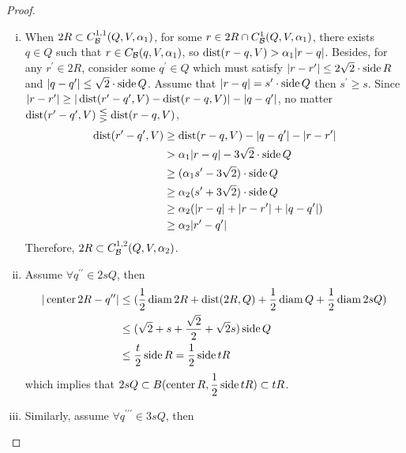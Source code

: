 \begin{proof}
    \begin{enumerate}[(i)]
        \item When $2R\subset C_\mathcal B^{1,1}(Q, V, \alpha_1)$, for some $r\in 2R\cap C_\mathcal B^1(Q, V, \alpha_1)$, there exists $q\in Q$ such that $r\in C_\mathcal B(q, V, \alpha_1)$, so $\operatorname{dist}(r-q, V)>\alpha_1|r-q|$. Besides, for any $r^\prime\in 2R$, consider some $q^\prime\in Q$ which must satisfy $|r-r^\prime|\leq 2\sqrt{2}\cdot\operatorname{side} R$ and $|q-q^\prime|\leq \sqrt{2}\cdot\operatorname{side} Q$. Assume that $|r-q| = s^\prime\cdot\operatorname{side} Q$ then $s^\prime \geq s$. Since $ |r-r^\prime| \geq|\operatorname{dist} (r^\prime-q^\prime, V)-\operatorname{dist}(r-q, V)| - |q-q^\prime|$, no matter $\operatorname{dist} (r^\prime-q^\prime, V)\lesseqgtr\operatorname{dist}(r-q, V)$,
        \begin{equation*}
            \begin{split}
                \operatorname{dist}(r^\prime-q^\prime, V) &\geq \operatorname{dist}(r-q, V)-|q-q^\prime|-|r-r^\prime| \\
                &> \alpha_1|r-q| - 3\sqrt{2} \cdot\operatorname{side} Q\\
                &\geq (\alpha_1 s^\prime- 3\sqrt{2})\cdot\operatorname{side} Q\\
                &\geq \alpha_2(s^\prime+3\sqrt{2})\cdot\operatorname{side} Q \\
                &\geq \alpha_2(|r-q|+|r-r^\prime|+|q-q^\prime|)\\
                &\geq \alpha_2|r^\prime-q^\prime|
            \end{split}
        \end{equation*}
        Therefore, $2R\subset  C_\mathcal B^{1,2}(Q, V, \alpha_2)$.
        \item Assume $\forall q^{\prime\prime}\in 2sQ$, then
        \begin{equation*}
            \begin{split}
                |\operatorname{center} 2R - q^{\prime\prime}| &\leq (\frac{1}{2}\operatorname{diam} 2R + \operatorname{dist}(2R, Q) + \frac{1}{2}\operatorname{diam} Q + \frac{1}{2}\operatorname{diam} 2sQ)\\
                &\leq (\sqrt{2}+s+\frac{\sqrt{2}}{2} + \sqrt{2}s ) \operatorname{side} Q \\
                &\leq \frac{t}{2}\operatorname{side} R = \frac{1}{2}\operatorname{side} tR
            \end{split}
        \end{equation*}
        which implies that $\displaystyle 2sQ \subset B(\operatorname{center} R, \frac{1}{2}\operatorname{side} tR)\subset tR$.
        \item Similarly, assume $\forall q^{\prime\prime\prime}\in 3sQ$, then

\end{enumerate}
\end{proof}
